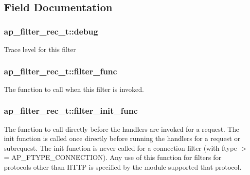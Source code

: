 \subsection{Field Documentation}
\subsubsection[{\texorpdfstring{debug}{debug}}]{ ap\+\_\+filter\+\_\+rec\+\_\+t\+::debug}\hypertarget{structap__filter__rec__t_a882b8c4c8f304e9e948baad79f46afa4}{}\label{structap__filter__rec__t_a882b8c4c8f304e9e948baad79f46afa4}
Trace level for this filter 
\subsubsection[{\texorpdfstring{filter\+\_\+func}{filter_func}}]{ ap\+\_\+filter\+\_\+rec\+\_\+t\+::filter\+\_\+func}\hypertarget{structap__filter__rec__t_a53fedc6d31f863c98fbe19fa5ae32bb0}{}\label{structap__filter__rec__t_a53fedc6d31f863c98fbe19fa5ae32bb0}
The function to call when this filter is invoked. 
\subsubsection[{\texorpdfstring{filter\+\_\+init\+\_\+func}{filter_init_func}}]{ ap\+\_\+filter\+\_\+rec\+\_\+t\+::filter\+\_\+init\+\_\+func}\hypertarget{structap__filter__rec__t_a3bcc0263a11aa25b6050df5c62bfd2e0}{}\label{structap__filter__rec__t_a3bcc0263a11aa25b6050df5c62bfd2e0}
The function to call directly before the handlers are invoked for a request. The init function is called once directly before running the handlers for a request or subrequest. The init function is never called for a connection filter (with ftype $>$= A\+P\+\_\+\+F\+T\+Y\+P\+E\+\_\+\+C\+O\+N\+N\+E\+C\+T\+I\+ON). Any use of this function for filters for protocols other than H\+T\+TP is specified by the module supported that protocol. 
